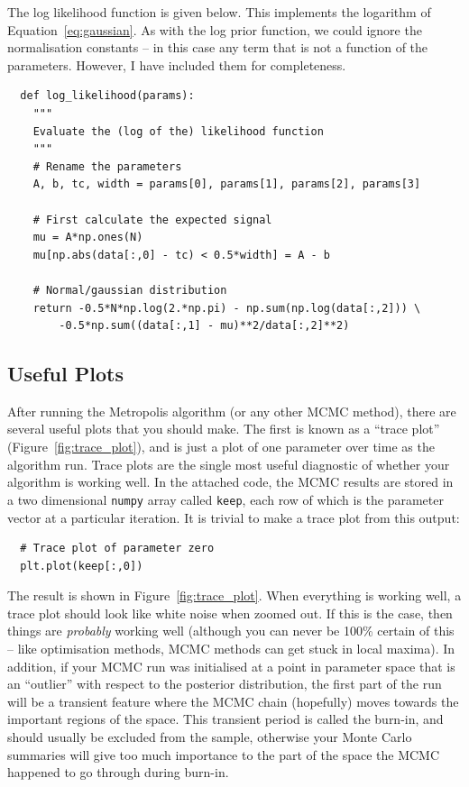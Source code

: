 The log likelihood function is given below. This implements the logarithm of
Equation~\ref{eq:gaussian}. As with the log prior function, we could ignore the
normalisation constants -- in this case any term that is not a function of the
parameters. However, I have included them for completeness.

\begin{verbatim}
  def log_likelihood(params):
    """
    Evaluate the (log of the) likelihood function
    """
    # Rename the parameters
    A, b, tc, width = params[0], params[1], params[2], params[3]

    # First calculate the expected signal
    mu = A*np.ones(N)
    mu[np.abs(data[:,0] - tc) < 0.5*width] = A - b

    # Normal/gaussian distribution
    return -0.5*N*np.log(2.*np.pi) - np.sum(np.log(data[:,2])) \
        -0.5*np.sum((data[:,1] - mu)**2/data[:,2]**2)
\end{verbatim}

\subsection{Useful Plots}
After running the Metropolis algorithm (or any other MCMC method), there are
several useful plots that you should make. The first is known as a
``trace plot'' (Figure~\ref{fig:trace_plot}),
and is just a plot of one parameter over time as the algorithm run. Trace plots
are the single most useful diagnostic of whether your algorithm is working well.
In the attached code, the MCMC results are stored in a two dimensional
{\tt numpy} array called {\tt keep}, each row of which is the parameter vector
at a particular iteration. It is trivial to make a trace plot from this output:

\begin{verbatim}
  # Trace plot of parameter zero
  plt.plot(keep[:,0])
\end{verbatim}
The result is shown in Figure~\ref{fig:trace_plot}. When everything is working
well, a trace plot should look like white noise when zoomed out. If this is the
case, then things are {\it probably} working well (although you can never be
100\% certain of this -- like optimisation methods, MCMC methods can get
stuck in local maxima). In addition, if your MCMC run was initialised at a
point in parameter space that is an ``outlier'' with respect to the posterior
distribution, the first part of the run will be a transient feature where the
MCMC chain (hopefully) moves towards the important regions of the space.
This transient period is called the burn-in, and should usually be excluded
from the sample, otherwise your Monte Carlo summaries will give too much
importance to the part of the space the MCMC happened to go through during
burn-in.

